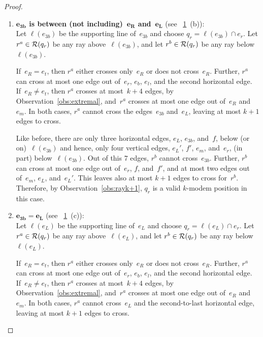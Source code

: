 \documentclass[A4]{article}
\begin{document}
\begin{proof}
\begin{enumerate}
\begin{figure}[htb]
  \centering
  \texttt{[image: stairendproof]}
  \caption{Sketches for the proof of Lemma~\ref{lem:k+7}:
	  Case~${e_{3b}=e_R}$ (a).
	  Case~${e_{3b}}$ is between (not including)~$\mathbf{e_{R}}$ and~$\mathbf{e_{L}}$ (b).
      Case~${e_{3b}=e_L}$ (c).}
  \label{fig:stairendproof1-3}
\end{figure}

\item \textbf{$\mathbf{e_{3b}}$ is between (not including)~$\mathbf{e_{R}}$ and~$\mathbf{e_{L}}$} (see \figurename~\ref{fig:stairendproof1-3}~(b)):\\
Let $\ell(e_{3b})$ be the supporting line of~$e_{3b}$ and choose $q_r=\ell(e_{3b})\cap e_r$.
Let $r^a\in{\cal R}(q_r)$ be any ray above~$\ell(e_{3b})$, and let $r^b\in{\cal R}(q_r)$ be any ray below~$\ell(e_{3b})$.

If~$e_R=e_t$, then $r^a$ either crosses only~$e_R$ or does not cross~$e_R$.
Further, $r^a$ can cross at most one edge out of~$e_r$, $e_b$, $e_l$, and the second horizontal edge.
If~$e_R\neq e_t$, then $r^a$ crosses at most~$k+4$ edges, by Observation~\ref{obs:extremal}, and~$r^a$ crosses at most one edge out of~$e_R$ and~$e_m$.
In both cases, $r^a$ cannot cross the edges~$e_{3b}$ and~$e_L$, leaving at most $k+1$ edges to cross.

Like before, there are only three horizontal edges, $e_L$, $e_{3b}$, and~$f$, below (or on)~$\ell(e_{3b})$ and hence, only four vertical edges, $e_L'$, $f'$, $e_m$, and~$e_r$, (in part) below~$\ell(e_{3b})$. 
Out of this $7$ edges, $r^b$ cannot cross~$e_{3b}$.
Further, $r^b$ can cross at most one edge out of~$e_r$, $f$, and~$f'$, and at most two edges out of~$e_m$, $e_L$, and~$e_L'$.
This leaves also at most $k+1$ edges to cross for~$r^b$.
Therefore, by Observation~\ref{obs:rayk+1}, $q_r$ is a valid \mbox{$k$-modem} position in this case.

\item \textbf{$\mathbf{e_{3b}=e_L}$} (see \figurename~\ref{fig:stairendproof1-3}~(c)):\\
Let $\ell(e_L)$ be the supporting line of~$e_L$ and choose $q_r=\ell(e_L)\cap e_r$.
Let $r^a\in{\cal R}(q_r)$ be any ray above~$\ell(e_L)$, and let $r^b\in{\cal R}(q_r)$ be any ray below~$\ell(e_L)$.

If~$e_R=e_t$, then $r^a$ either crosses only~$e_R$ or does not cross~$e_R$.
Further, $r^a$ can cross at most one edge out of~$e_r$, $e_b$, $e_l$, and the second horizontal edge.
If~$e_R\neq e_t$, then $r^a$ crosses at most~$k+4$ edges, by Observation~\ref{obs:extremal}, and~$r^a$ crosses at most one edge out of~$e_R$ and~$e_m$.
In both cases, $r^a$ cannot cross~$e_L$ and the second-to-last horizontal edge, leaving at most $k+1$ edges to cross.


\end{enumerate}
\end{proof}
\end{document}

